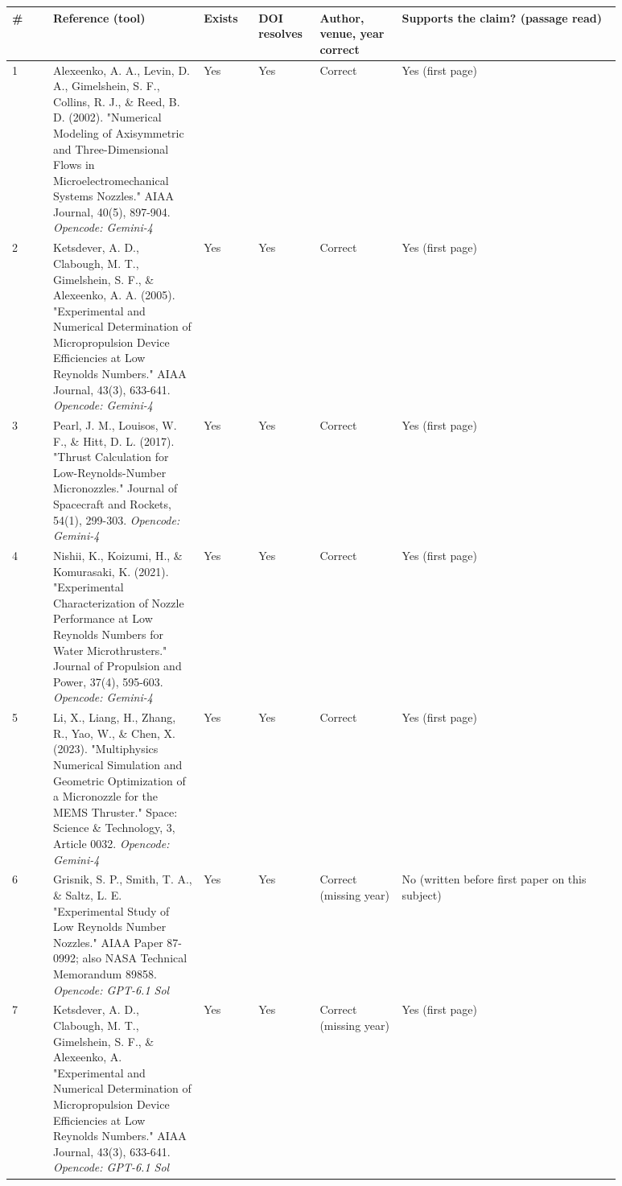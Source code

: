\begin{longtable}{@{}p{0.06\linewidth}p{0.22\linewidth}p{0.08\linewidth}p{0.08\linewidth}p{0.12\linewidth}p{0.32\linewidth}@{}}
  \toprule
  \# & Reference (tool) & Exists & DOI resolves & Author, venue, year correct & Supports the claim? (passage read) \\
  \midrule
  \endhead
    1 & Alexeenko, A. A., Levin, D. A., Gimelshein, S. F., Collins, R. J., \& Reed, B. D. (2002). "Numerical Modeling of Axisymmetric and Three-Dimensional Flows in Microelectromechanical Systems Nozzles." AIAA Journal, 40(5), 897-904. \textit{Opencode: Gemini-4} & Yes & Yes & Correct & Yes (first page) \\
    2 & Ketsdever, A. D., Clabough, M. T., Gimelshein, S. F., \& Alexeenko, A. A. (2005). "Experimental and Numerical Determination of Micropropulsion Device Efficiencies at Low Reynolds Numbers." AIAA Journal, 43(3), 633-641. \textit{Opencode: Gemini-4} & Yes & Yes & Correct & Yes (first page) \\
    3 & Pearl, J. M., Louisos, W. F., \& Hitt, D. L. (2017). "Thrust Calculation for Low-Reynolds-Number Micronozzles." Journal of Spacecraft and Rockets, 54(1), 299-303. \textit{Opencode: Gemini-4} & Yes & Yes & Correct & Yes (first page) \\
    4 & Nishii, K., Koizumi, H., \& Komurasaki, K. (2021). "Experimental Characterization of Nozzle Performance at Low Reynolds Numbers for Water Microthrusters." Journal of Propulsion and Power, 37(4), 595-603. \textit{Opencode: Gemini-4} & Yes & Yes & Correct & Yes (first page) \\
    5 & Li, X., Liang, H., Zhang, R., Yao, W., \& Chen, X. (2023). "Multiphysics Numerical Simulation and Geometric Optimization of a Micronozzle for the MEMS Thruster." Space: Science \& Technology, 3, Article 0032. \textit{Opencode: Gemini-4} & Yes & Yes & Correct & Yes (first page) \\
    6 & Grisnik, S. P., Smith, T. A., \& Saltz, L. E. "Experimental Study of Low Reynolds Number Nozzles." AIAA Paper 87-0992; also NASA Technical Memorandum 89858. \textit{Opencode: GPT-6.1 Sol} & Yes & Yes & Correct (missing year) & No (written before first paper on this subject) \\
    7 & Ketsdever, A. D., Clabough, M. T., Gimelshein, S. F., \& Alexeenko, A. "Experimental and Numerical Determination of Micropropulsion Device Efficiencies at Low Reynolds Numbers." AIAA Journal, 43(3), 633-641. \textit{Opencode: GPT-6.1 Sol} & Yes & Yes & Correct  (missing year) & Yes (first page) \\

\end{longtable}
